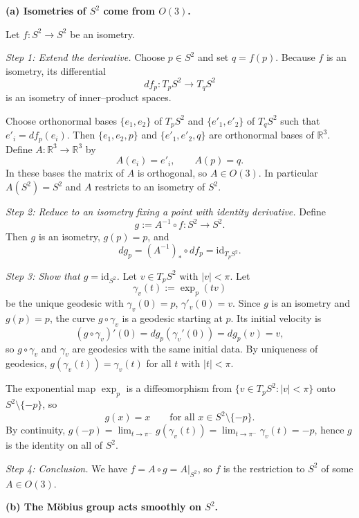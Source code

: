\begin{solution}
\par\medskip\noindent\textbf{(a) Isometries of $S^{2}$ come from $O(3)$.}\par\smallskip

	
	Let $f:S^{2}\to S^{2}$ be an isometry.
	
	\emph{Step 1: Extend the derivative.}
	Choose $p\in S^{2}$ and set $q=f(p)$.  
	Because $f$ is an isometry, its differential
	\[
	df_p:T_pS^{2}\to T_qS^{2}
	\]
	is an isometry of inner--product spaces.
	
	Choose orthonormal bases $\{e_1,e_2\}$ of $T_pS^{2}$ and $\{e'_1,e'_2\}$ of $T_qS^{2}$ such that
	$e'_i=df_p(e_i)$. Then $\{e_1,e_2,p\}$ and $\{e'_1,e'_2,q\}$ are orthonormal bases of $\mathbb{R}^{3}$.
	Define $A:\mathbb{R}^{3}\to\mathbb{R}^{3}$ by
	\[
	A(e_i)=e'_i,\qquad A(p)=q.
	\]
	In these bases the matrix of $A$ is orthogonal, so $A\in O(3)$.
	In particular $A(S^{2})=S^{2}$ and $A$ restricts to an isometry of $S^{2}$.
	
	\emph{Step 2: Reduce to an isometry fixing a point with identity derivative.}
	Define
	\[
	g := A^{-1}\circ f:S^{2}\to S^{2}.
	\]
	Then $g$ is an isometry, $g(p)=p$, and
	\[
	dg_p=(A^{-1})_{*}\circ df_p=\mathrm{id}_{T_pS^{2}}.
	\]
	
	\emph{Step 3: Show that $g=\mathrm{id}_{S^{2}}$.}
	Let $v\in T_pS^{2}$ with $|v|<\pi$. Let
	\[
	\gamma_v(t):=\exp_p(tv)
	\]
	be the unique geodesic with $\gamma_v(0)=p$, $\gamma'_v(0)=v$.
	Since $g$ is an isometry and $g(p)=p$, the curve $g\circ\gamma_v$ is a geodesic starting at $p$.
	Its initial velocity is
	\[
	(g\circ\gamma_v)'(0)=dg_p(\gamma_v'(0))=dg_p(v)=v,
	\]
	so $g\circ\gamma_v$ and $\gamma_v$ are geodesics with the same initial data.
	By uniqueness of geodesics, $g(\gamma_v(t))=\gamma_v(t)$ for all $t$ with $|t|<\pi$.
	
	The exponential map $\exp_p$ is a diffeomorphism from
	$\{v\in T_pS^{2}:|v|<\pi\}$ onto $S^{2}\setminus\{-p\}$, so
	\[
	g(x)=x\qquad\text{for all }x\in S^{2}\setminus\{-p\}.
	\]
	By continuity, $g(-p)=\lim_{t\to\pi^-}g(\gamma_v(t))
	=\lim_{t\to\pi^-}\gamma_v(t)=-p$, hence $g$ is the identity on all of $S^{2}$.
	
	\emph{Step 4: Conclusion.}
	We have $f=A\circ g=A|_{S^{2}}$, so $f$ is the restriction to $S^{2}$ of some $A\in O(3)$.
	
	\par\medskip\noindent\textbf{(b) The M\"obius group acts smoothly on $S^{2}$.}\par\smallskip


\end{solution}

